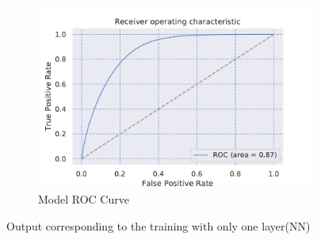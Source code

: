 \begin{figure}[H]
\begin{subfigure}[b]{0.3\textwidth}
         \centering
         \includegraphics[width=\textwidth]{figure_3/one_layer_only_ROC.pdf}
         \caption{Model ROC Curve}
         \label{fig:five over x}
     \end{subfigure}
        \caption{Output corresponding to the training with only one layer(NN)}
        \label{fig:three graphs}
\end{figure}


